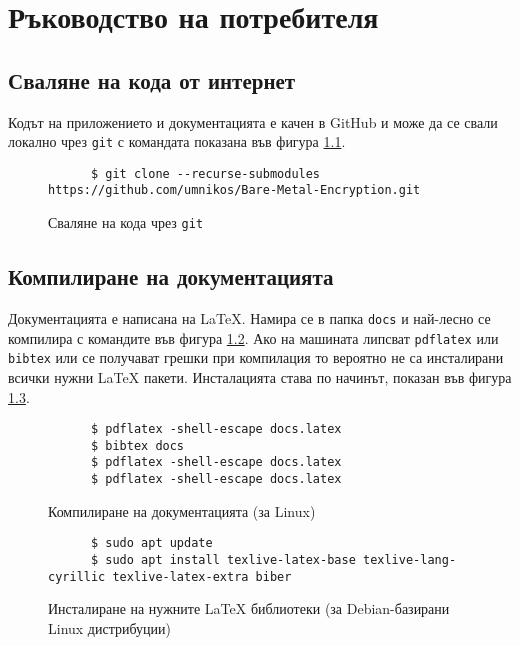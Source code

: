 \chapter{Ръководство на потребителя}
  \section{Сваляне на кода от интернет}
  Кодът на приложението и документацията е качен в GitHub и може да се свали локално чрез {\tt git} с командата показана във фигура \ref{fig:repo-download}.
  \begin{figure}[ht]
    \centering
    \begin{verbatim}
      $ git clone --recurse-submodules https://github.com/umnikos/Bare-Metal-Encryption.git
    \end{verbatim}
    \caption{Сваляне на кода чрез {\tt git}}
    \label{fig:repo-download}
  \end{figure}

  \section{Компилиране на документацията}
  Документацията е написана на \LaTeX{}. Намира се в папка {\tt docs} и най-лесно се компилира с командите във фигура \ref{fig:latex-compiling}. Ако на машината липсват {\tt pdflatex} или {\tt bibtex} или се получават грешки при компилация то вероятно не са инсталирани всички нужни \LaTeX{} пакети. Инсталацията става по начинът, показан във фигура \ref{fig:latex-requirements}.
  \begin{figure}[ht]
    \centering
    \begin{verbatim}
      $ pdflatex -shell-escape docs.latex
      $ bibtex docs
      $ pdflatex -shell-escape docs.latex
      $ pdflatex -shell-escape docs.latex
    \end{verbatim}
    \caption{Компилиране на документацията (за Linux)}
    \label{fig:latex-compiling}
  \end{figure}
  \begin{figure}[ht]
    \centering
    \begin{verbatim}
      $ sudo apt update
      $ sudo apt install texlive-latex-base texlive-lang-cyrillic texlive-latex-extra biber
    \end{verbatim}
    \caption{Инсталиране на нужните \LaTeX{} библиотеки (за Debian-базирани Linux дистрибуции)}
    \label{fig:latex-requirements}
  \end{figure}

